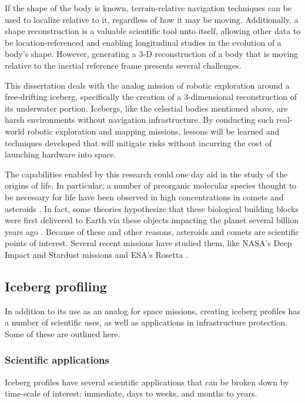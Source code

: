 If the shape of the body is known, terrain-relative navigation techniques can be used to localize relative to it, regardless of how it may be moving. Additionally, a shape reconstruction is a valuable scientific tool unto itself, allowing other data to be location-referenced and enabling longitudinal studies in the evolution of a body's shape. However, generating a 3-D reconstruction of a body that is moving relative to the inertial reference frame presents several challenges.

This dissertation deals with the analog mission of robotic exploration around a free-drifting iceberg, specifically the creation of a 3-dimensional reconstruction of its underwater portion. Icebergs, like the celestial bodies mentioned above, are harsh environments without navigation infrastructure. By conducting such real-world robotic exploration and mapping missions, lessons will be learned and techniques developed that will mitigate risks without incurring the cost of launching hardware into space. 

The capabilities enabled by this research could one day aid in the study of the origins of life. In particular, a number of preorganic molecular species thought to be necessary for life have been observed in high concentrations in comets and asteroids \cite{Fomenkova1999}. In fact, some theories hypothesize that these biological building blocks were first delivered to Earth via these objects impacting the planet several billion years ago \cite{Chyba1992}. Because of these and other reasons, asteroids and comets are scientific points of interest. Several recent missions have studied them, like NASA's Deep Impact and Stardust missions\cite{Ahearn2005,Willcockson1999} and ESA's Rosetta \cite{Bibring2007}.

\subsection{Iceberg profiling}

In addition to its use as an analog for space missions, creating iceberg profiles has a number of scientific uses, as well as applications in infrastructure protection. Some of these are outlined here.

\subsubsection{Scientific applications}

Iceberg profiles have several scientific applications that can be broken down by time-scale of interest: immediate, days to weeks, and months to years. 

